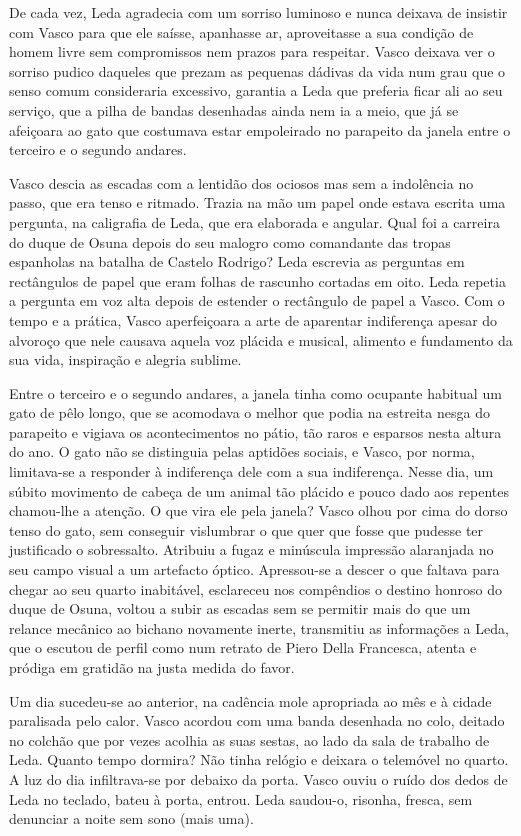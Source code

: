 De cada vez, Leda agradecia com um sorriso luminoso e nunca deixava de
insistir com Vasco para que ele saísse, apanhasse ar, aproveitasse a sua
condição de homem livre sem compromissos nem prazos para respeitar.
Vasco deixava ver o sorriso pudico daqueles que prezam as pequenas
dádivas da vida num grau que o senso comum consideraria excessivo, garantia a Leda que preferia ficar ali ao seu serviço, que a pilha de
bandas desenhadas ainda nem ia a meio, que já se afeiçoara ao gato que
costumava estar empoleirado no parapeito da janela entre o terceiro e o
segundo andares.

Vasco descia as escadas com a lentidão dos ociosos mas sem a indolência
no passo, que era tenso e ritmado. Trazia na mão um papel onde estava
escrita uma pergunta, na caligrafia de Leda, que era elaborada e
angular. Qual foi a carreira do duque de Osuna depois do seu malogro
como comandante das tropas espanholas na batalha de Castelo Rodrigo?
Leda escrevia as perguntas em rectângulos de papel que eram folhas de
rascunho cortadas em oito. Leda repetia a pergunta em voz alta depois de
estender o rectângulo de papel a Vasco.
Com o tempo e a prática, Vasco aperfeiçoara a arte de aparentar
indiferença apesar do alvoroço que nele causava aquela voz plácida e
musical, alimento e fundamento da sua vida, inspiração e alegria
sublime.

Entre o terceiro e o segundo andares, a janela tinha como ocupante
habitual um gato de pêlo longo, que se acomodava o melhor que podia na
estreita nesga do parapeito e vigiava os acontecimentos no pátio, tão
raros e esparsos nesta altura do ano. O gato não se distinguia pelas
aptidões sociais, e Vasco, por norma, limitava-se a responder à
indiferença dele com a sua indiferença. Nesse dia, um súbito movimento
de cabeça de um animal tão plácido e pouco dado aos repentes chamou-lhe a atenção. O que vira ele pela janela? Vasco olhou por cima do
dorso tenso do gato, sem conseguir vislumbrar o que quer que fosse que
pudesse ter justificado o sobressalto. Atribuiu a fugaz e minúscula
impressão alaranjada no seu campo visual a um artefacto óptico.
Apressou-se a descer o que faltava para chegar ao seu quarto inabitável,
esclareceu nos compêndios o destino honroso do duque de Osuna, voltou
a subir as escadas sem se permitir mais do que um relance mecânico ao
bichano novamente inerte, transmitiu as informações a Leda, que o
escutou de perfil como num retrato de Piero Della Francesca, atenta e
pródiga em gratidão na justa medida do favor.

Um dia sucedeu-se ao anterior, na cadência mole apropriada ao mês e à
cidade paralisada pelo calor. Vasco acordou com uma banda desenhada no
colo, deitado no colchão que por vezes acolhia as suas sestas, ao lado
da sala de trabalho de Leda. Quanto tempo dormira? Não tinha relógio e
deixara o telemóvel no quarto. A luz do dia infiltrava-se por debaixo da
porta. Vasco ouviu o ruído dos dedos de Leda no teclado,
bateu à porta, entrou. Leda saudou-o, risonha, fresca, sem denunciar a
noite sem sono (mais uma).

